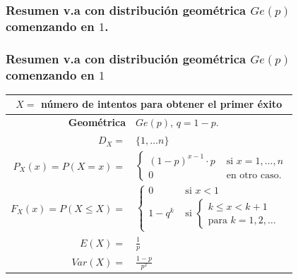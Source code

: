 \documentclass[handout]{beamer}\usepackage[]{graphicx}\usepackage[]{color}
\renewcommand{\leq}{\leqslant}
\theoremstyle{plain}
\theoremstyle{definition}
\begin{document}
\begin{frame}
\subsubsection{Resumen v.a con distribución geométrica $Ge(p)$ comenzando en $1$.}

\frametitle{Resumen v.a con distribución geométrica $Ge(p)$ comenzando  en $1$}
\setlength{\tabcolsep}{1pt}
\begin{table}
\centering
\begin{tabular}{|rl|}
\hline 
\multicolumn{2}{|c|}{$X=$ número de intentos  para obtener el primer éxito}\\ 
\hline
\hline
\textbf{Geométrica} & $Ge(p)$, $q=1-p$.\\
\hline \hline 
$D_X=$&  $\{1,\ldots n\}$ \\\hline 
$P_X(x)=P(X=x)=$ & 
$\left\{
\begin{array}{ll}
  (1-p)^{x-1}\cdot p & \mbox{ si } x=1,\ldots,n\\
     0  & \mbox{ en otro caso.}
     \end{array}\right.$
\\ \hline 
$F_X(x)=P(X\leq X)=$ & $\left\{\begin{array}{ll} 0 & \mbox{ si } x<1\\
  1- q^{k} & \mbox{ si } \left\{ \begin{array}{l}k\leq x< k+1\\\mbox{para } k=1,2,\ldots\end{array}
    \right.\end{array}\right.$ \\\hline 
$E(X)=$ &  $\frac{1}{p}$ \\
$Var(X)=$ & $\frac{1-p}{p^2}$\\
\hline
\end{tabular}
\end{table}
\setlength{\tabcolsep}{6pt}
\end{frame}
\end{document}
